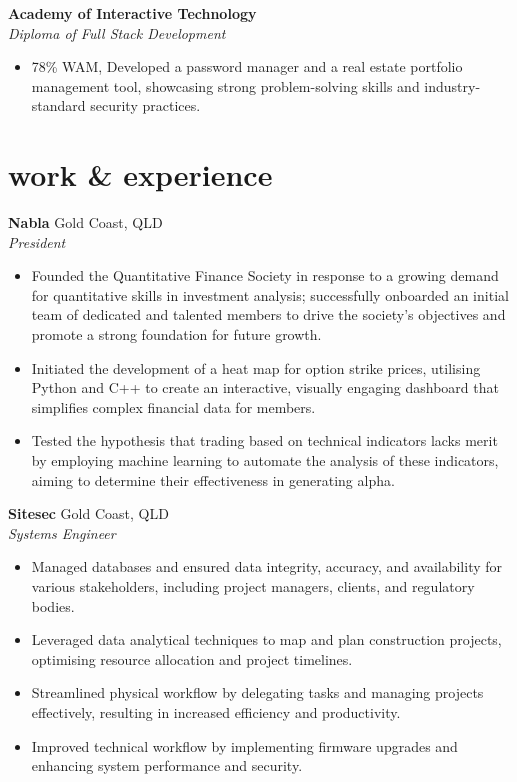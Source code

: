 \documentclass[12pt]{article}
\begin{document}
\textbf{Academy of Interactive Technology} \\
\indent \textit{\color{subtextgray}Diploma of Full Stack Development}
\begin{itemize}[topsep=0em, left=0.8em]	
  \item 78\% WAM, Developed a password manager and a real estate portfolio management tool, showcasing strong problem-solving skills and industry-standard security practices.
\end{itemize}

\vspace{1em}

\section{work \& experience}

\vspace{0.20em}

\textbf{Nabla} \hfill {Gold Coast, QLD} \\
\indent \textit{\color{subtextgray}President}
\begin{itemize}[noitemsep, topsep=0em, left=0.8em]
  \item Founded the Quantitative Finance Society in response to a growing demand for quantitative skills in investment analysis; successfully onboarded an initial team of dedicated and talented members to drive the society's objectives and promote a strong foundation for future growth.
  \item	Initiated the development of a heat map for option strike prices, utilising Python and C++ to create an interactive, visually engaging dashboard that simplifies complex financial data for members.
  \item Tested the hypothesis that trading based on technical indicators lacks merit by employing machine learning to automate the analysis of these indicators, aiming to determine their effectiveness in generating alpha.
\end{itemize}

\textbf{Sitesec} \hfill {Gold Coast, QLD} \\
\indent \textit{\color{subtextgray}Systems Engineer}
\begin{itemize}[noitemsep, topsep=0em, left=0.8em]
  \item Managed databases and ensured data integrity, accuracy, and availability for various stakeholders, including project managers, clients, and regulatory bodies.
  \item	Leveraged data analytical techniques to map and plan construction projects, optimising resource allocation and project timelines.
  \item Streamlined physical workflow by delegating tasks and managing projects effectively, resulting in increased efficiency and productivity.
  \item Improved technical workflow by implementing firmware upgrades and enhancing system performance and security.
\end{itemize}
\end{document}
